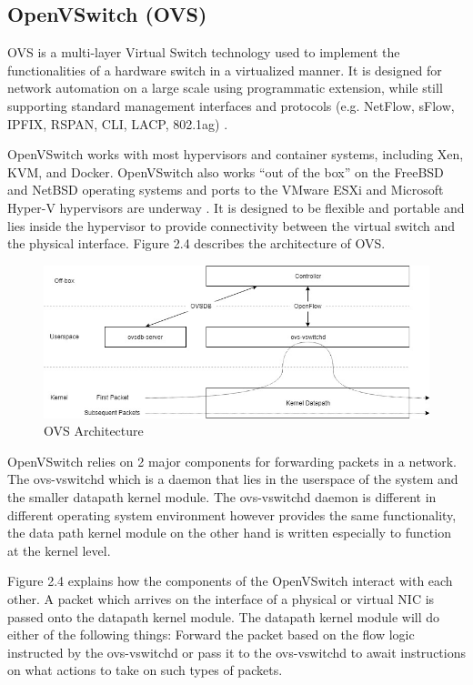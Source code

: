 \subsection{OpenVSwitch (OVS)}
OVS is a multi-layer Virtual Switch technology used to implement the functionalities of a hardware switch in a virtualized manner. It is designed for network automation  on a large scale using programmatic extension, while still supporting standard management interfaces and protocols (e.g. NetFlow, sFlow, IPFIX, RSPAN, CLI, LACP, 802.1ag) \cite{OVS}.

OpenVSwitch works with most hypervisors and container systems, including Xen, KVM, and Docker. OpenVSwitch also works “out of the box” on the FreeBSD and NetBSD operating systems and ports to the VMware ESXi and Microsoft Hyper-V hypervisors are underway \cite{pfaff2015design}. It is designed to be flexible and portable and lies inside the hypervisor to provide connectivity between the virtual switch and the physical interface. Figure 2.4 describes the architecture of OVS.

\begin{figure}[H]
       \centering\includegraphics[width=\textwidth]{images/8_OVS_Architecture.jpg}
       \caption{OVS Architecture}
       \label{fig:compbest}
\end{figure}

OpenVSwitch relies on 2 major components for forwarding packets in a network. The ovs-vswitchd which is a daemon that lies in the userspace of the system and the smaller datapath kernel module. The ovs-vswitchd daemon is different in different operating system environment however provides the same functionality, the data path kernel module on the other hand is written especially to function at the kernel level.

Figure 2.4 explains how the components of the OpenVSwitch interact with each other. A packet which arrives on the interface of a physical or virtual NIC is passed onto the datapath kernel module. The datapath kernel module will do either of the following things: Forward the packet based on the flow logic instructed by the ovs-vswitchd or pass it to the ovs-vswitchd to await instructions on what actions to take on such types of packets.

